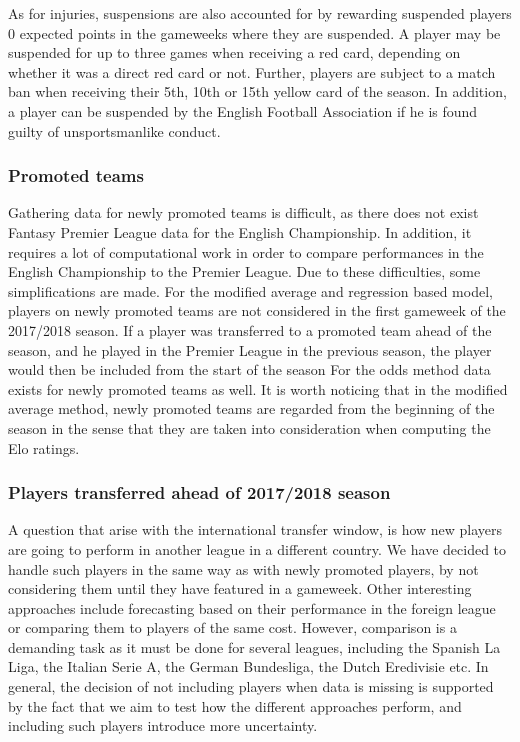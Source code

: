 \newpar

As for injuries, suspensions are also accounted for by rewarding suspended players 0 expected points in the gameweeks where they are suspended. A player may be suspended for up to three games when receiving a red card, depending on whether it was a direct red card or not. Further, players are subject to a match ban when receiving their 5th, 10th or 15th yellow card of the season. In addition, a player can be suspended by the English Football Association if he is found guilty of unsportsmanlike conduct. 


\subsubsection{Promoted teams}
Gathering data for newly promoted teams is difficult, as there does not exist Fantasy Premier League data for the English Championship. In addition, it requires a lot of computational work in order to compare performances in the English Championship to the Premier League. Due to these difficulties, some simplifications are made. For the modified average and regression based model, players on newly promoted teams are not considered in the first gameweek of the 2017/2018 season. If a player was transferred to a promoted team ahead of the season, and he played in the Premier League in the previous season, the player would then be included from the start of the season For the odds method data exists for newly promoted teams as well. It is worth noticing that in the modified average method, newly promoted teams are regarded from the beginning of the season in the sense that they are taken into consideration when computing the Elo ratings. 

\subsubsection{Players transferred ahead of 2017/2018 season}
A question that arise with the international transfer window, is how new players are going to perform in another league in a different country. We have decided to handle such players in the same way as with newly promoted players, by not considering them until they have featured in a gameweek. Other interesting approaches include forecasting based on their performance in the foreign league or comparing them to players of the same cost. However, comparison is a demanding task as it must be done for several leagues, including the Spanish La Liga, the Italian Serie A, the German Bundesliga, the Dutch Eredivisie etc. In general, the decision of not including players when data is missing is supported by the fact that we aim to test how the different approaches perform, and including such players introduce more uncertainty.


